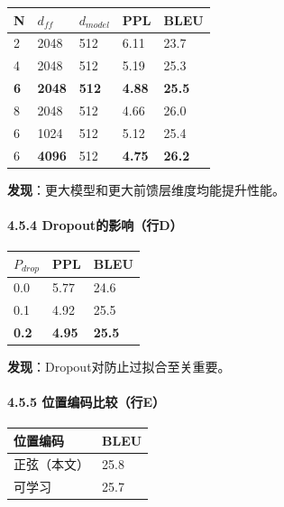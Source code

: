 \documentclass[11pt,a4paper]{article}
\begin{document}
\begin{center}
\begin{tabular}{|l|l|l|l|l|}
\hline
N & $d_{ff}$ & $d_{model}$ & PPL & BLEU \\
\hline
2 & 2048 & 512 & 6.11 & 23.7 \\
\hline
4 & 2048 & 512 & 5.19 & 25.3 \\
\hline
\textbf{6} & \textbf{2048} & \textbf{512} & \textbf{4.88} & \textbf{25.5} \\
\hline
8 & 2048 & 512 & 4.66 & 26.0 \\
\hline
6 & 1024 & 512 & 5.12 & 25.4 \\
\hline
6 & \textbf{4096} & 512 & \textbf{4.75} & \textbf{26.2} \\
\hline
\end{tabular}
\end{center}

\textbf{发现}：更大模型和更大前馈层维度均能提升性能。

\paragraph{4.5.4 Dropout的影响（行D）}

\begin{center}
\begin{tabular}{|l|l|l|}
\hline
$P_{drop}$ & PPL & BLEU \\
\hline
0.0 & 5.77 & 24.6 \\
\hline
0.1 & 4.92 & 25.5 \\
\hline
\textbf{0.2} & \textbf{4.95} & \textbf{25.5} \\
\hline
\end{tabular}
\end{center}

\textbf{发现}：Dropout对防止过拟合至关重要。

\paragraph{4.5.5 位置编码比较（行E）}

\begin{center}
\begin{tabular}{|l|l|}
\hline
位置编码 & BLEU \\
\hline
正弦（本文） & 25.8 \\
\hline
可学习 & 25.7 \\
\hline
\end{tabular}
\end{center}
\end{document}
